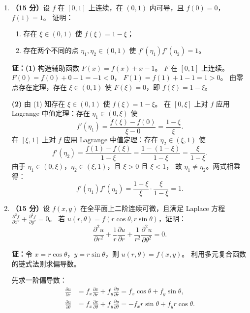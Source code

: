 \documentclass[12pt,a4paper]{ctexart}
\begin{document}
\begin{enumerate}[leftmargin=*,label=\arabic*.,start=9]
  \item \textbf{（15 分）}设 $f$ 在 $[0,1]$ 上连续，在 $(0,1)$ 内可导，且 $f(0)=0$，$f(1)=1$。
    证明：
    \begin{enumerate}
      \item 存在 $\xi \in (0,1)$ 使 $f(\xi) = 1-\xi$；
      \item 存在两个不同的点 $\eta_1, \eta_2 \in (0,1)$ 使 $f'(\eta_1)f'(\eta_2)=1$。
    \end{enumerate}

    \textbf{证：(1)} 构造辅助函数 $F(x) = f(x) + x - 1$。
    $F$ 在 $[0,1]$ 上连续。$F(0) = f(0) + 0 - 1 = -1 < 0$，
    $F(1) = f(1) + 1 - 1 = 1 > 0$。
    由零点存在定理，存在 $\xi \in (0,1)$ 使 $F(\xi)=0$，即 $f(\xi) = 1-\xi$。

    \textbf{(2)} 由 (1) 知存在 $\xi \in (0,1)$ 使 $f(\xi) = 1-\xi$。
    在 $[0,\xi]$ 上对 $f$ 应用 Lagrange 中值定理：存在 $\eta_1 \in (0,\xi)$ 使
    \[
    f'(\eta_1) = \frac{f(\xi)-f(0)}{\xi-0} = \frac{1-\xi}{\xi}.
    \]
    在 $[\xi,1]$ 上对 $f$ 应用 Lagrange 中值定理：存在 $\eta_2 \in (\xi,1)$ 使
    \[
    f'(\eta_2) = \frac{f(1)-f(\xi)}{1-\xi} = \frac{1-(1-\xi)}{1-\xi} = \frac{\xi}{1-\xi}.
    \]
    由于 $\eta_1 \in (0,\xi)$，$\eta_2 \in (\xi,1)$，且 $\xi > 0$ 且 $\xi < 1$，
    故 $\eta_1 \neq \eta_2$。两式相乘得：
    \[
    f'(\eta_1) f'(\eta_2) = \frac{1-\xi}{\xi} \cdot \frac{\xi}{1-\xi} = 1.
    \]

  \item \textbf{（15 分）}设 $f(x,y)$ 在全平面上二阶连续可微，且满足 Laplace 方程
    $\frac{\partial^2 f}{\partial x^2} + \frac{\partial^2 f}{\partial y^2} = 0$。
    若 $u(r,\theta) = f(r\cos\theta, r\sin\theta)$，证明：
    \[
    \frac{\partial^2 u}{\partial r^2} + \frac{1}{r}\frac{\partial u}{\partial r}
    + \frac{1}{r^2}\frac{\partial^2 u}{\partial\theta^2} = 0.
    \]

    \textbf{证：}令 $x = r\cos\theta$，$y = r\sin\theta$，则 $u(r,\theta) = f(x,y)$。
    利用多元复合函数的链式法则求偏导数。

    先求一阶偏导数：
    \begin{align*}
      \frac{\partial u}{\partial r}
      &= f_x \frac{\partial x}{\partial r} + f_y \frac{\partial y}{\partial r}
       = f_x \cos\theta + f_y \sin\theta, \\[4pt]
      \frac{\partial u}{\partial\theta}
      &= f_x \frac{\partial x}{\partial\theta} + f_y \frac{\partial y}{\partial\theta}
       = -f_x r\sin\theta + f_y r\cos\theta.
    \end{align*}


\end{enumerate}
\end{document}
